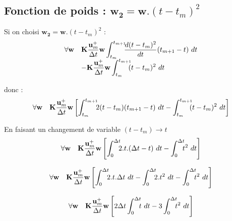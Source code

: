 \documentclass[12pt,a4paper]{report}
\begin{document}
\subsection{Fonction de poids : $ \mathbf{w_2} = \mathbf{w}.(t-t_m)^2$}
Si on choisi $ \mathbf{w_2} = \mathbf{w}.(t-t_m)^2$ :
\begin{equation}
\begin{array}{r l}
	\forall \mathbf{w}
	&\displaystyle
	 \mathbf{K} \frac{\mathbf{u}_m^+}{\Delta t} \mathbf{w} 
	 	\int_{t_m}^{t_{m+1}} \!\!\! \frac{d(t-t_m)^2}{dt}		
			(t_{m+1}-t) ~dt
	\\
	  &\displaystyle	
	   - \mathbf{K} \frac{ \mathbf{u}_m^+ }{\Delta t} \mathbf{w}
	   		\int_{t_m}^{t_{m+1}} \!\!\!  (t-t_m)^2 	~dt 
\end{array}
\end{equation}

donc :
\begin{equation}
\begin{array}{r l}
	\forall \mathbf{w}
	&\displaystyle
	 \mathbf{K} \frac{\mathbf{u}_m^+}{\Delta t} \mathbf{w}
	 	\left[
	 	  \int_{t_m}^{t_{m+1}} \!\!\! 2( t - t_m)(t_{m+1}-t) ~dt
	 	 -\int_{t_m}^{t_{m+1}} \!\!\!  (t-t_m)^2 	~dt 
	 	\right]
\end{array}
\end{equation}

En faisant un changement de variable $(t-t_m) \rightarrow t$
\begin{equation}
\begin{array}{r l}
	\forall \mathbf{w}
	&\displaystyle
	 \mathbf{K} \frac{\mathbf{u}_m^+}{\Delta t} \mathbf{w}
	 	\left[
	 	  \int_{0}^{\Delta t} \!\!\! 2.t.(\Delta t-t) ~dt
	 	 -\int_{0}^{\Delta t} \!\!\!  t^2 	~dt 
	 	\right]
\end{array}
\end{equation}

\begin{equation}
\begin{array}{r l}
	\forall \mathbf{w}
	&\displaystyle
	 \mathbf{K} \frac{\mathbf{u}_m^+}{\Delta t} \mathbf{w}
	 	\left[
	 	  \int_{0}^{\Delta t} \!\!\! 2.t.\Delta t ~dt
	 	 -\int_{0}^{\Delta t} \!\!\! 2.t^2 ~dt
	 	 -\int_{0}^{\Delta t} \!\!\!  t^2 	~dt 
	 	\right]
\end{array}
\end{equation}

\begin{equation}
\begin{array}{r l}
	\forall \mathbf{w}
	&\displaystyle
	 \mathbf{K} \frac{\mathbf{u}_m^+}{\Delta t} \mathbf{w}
	 	\left[
	 	  2\Delta t \int_{0}^{\Delta t} \!\!\! t ~dt
	 	 -3\int_{0}^{\Delta t} \!\!\! t^2 ~dt
	 	\right]
\end{array}
\end{equation}
\end{document}
